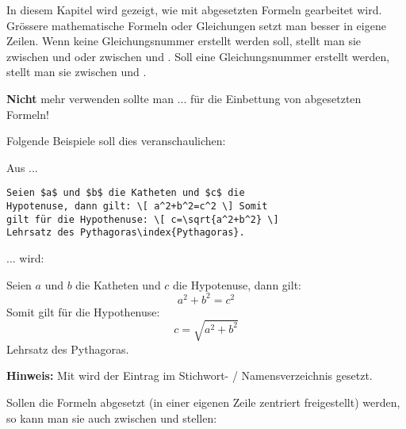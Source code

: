In diesem Kapitel wird gezeigt, wie mit abgesetzten Formeln  gearbeitet wird. Grössere mathematische Formeln oder Gleichungen setzt man besser in eigene Zeilen. Wenn keine Gleichungsnummer erstellt werden soll, stellt man sie zwischen  und  oder zwischen \code{\textbackslash{[}} und \code{\textbackslash{]}}. Soll eine Gleichungsnummer erstellt werden, stellt man sie zwischen  und . 

\par\bigskip 
\textbf{\large Nicht} mehr verwenden sollte man \code{\$\$} ... \code{\$\$} für die Einbettung von abgesetzten Formeln!

Folgende Beispiele soll dies veranschaulichen:

\par\bigskip 
\par\bigskip 
Aus ...

\begin{tcolorbox}[width=\textwidth,colback={light-gray},title={Latex-Text},colbacktitle=gray,coltitle=white]

\begin{verbatim}
Seien $a$ und $b$ die Katheten und $c$ die
Hypotenuse, dann gilt: \[ a^2+b^2=c^2 \] Somit
gilt für die Hypothenuse: \[ c=\sqrt{a^2+b^2} \]
Lehrsatz des Pythagoras\index{Pythagoras}. 
\end{verbatim}

\end{tcolorbox}

... wird:

\begin{tcolorbox}[width=\textwidth,colback={light-gray},title={Print-Text},colbacktitle=gray,coltitle=white]

Seien $a$ und $b$ die Katheten und $c$ die
Hypotenuse, dann gilt: \[ a^2+b^2=c^2 \] Somit
gilt für die Hypothenuse: \[ c=\sqrt{a^2+b^2} \]
Lehrsatz des Pythagoras. 

\end{tcolorbox}

\textbf{Hinweis:} Mit wird der Eintrag im Stichwort- / Namensverzeichnis gesetzt.


\pagebreak 
Sollen die Formeln abgesetzt (in einer eigenen Zeile zentriert freigestellt) werden, so kann man sie auch zwischen  und  stellen:

